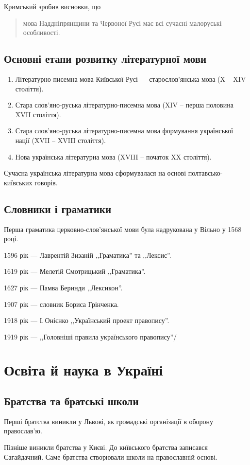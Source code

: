 \documentclass[a5paper,10pt,titlepage,pdftex,headsepline]{scrartcl}
\begin{document}
Кримський зробив висновки, що\begin{quote}мова Наддніпрянщини та Червоної Русі має всі сучасні малоруські особливості.\end{quote}
\subsection{Основні етапи розвитку літературної мови}
\begin{enumerate}
	\item Літературно-писемна мова Київської Русі --- старослов’янська мова (X -- XIV століття).
	\item Стара слов’яно-руська літературно-писемна мова (XIV -- перша половина XVII століття).
	\item Стара слов’яно-руська літературно-писемна мова формування української нації (XVII -- XVIII століття).
	\item Нова українська літературна мова (XVIII -- початок XX століття).
\end{enumerate}

Сучасна українська літературна мова сформувалася на основі полтавсько-київських говорів.
\subsection{Словники і граматики}
Перша граматика церковно-слов’янської мови була надрукована у Вільно у 1568 році.

1596 рік --- Лаврентій Зизаній ,,Граматика'' та ,,Лексис''.

1619 рік --- Мелетій Смотрицький ,,Граматика''.

1627 рік --- Памва Беринди ,,Лексикон''.

1907 рік --- словник Бориса Грінченка.

1918 рік --- І.\,Онієнко ,,Український проект правопису''.

1919 рік --- ,,Головніші правила українського правопису''/
\section{Освіта й наука в Україні}
\subsection{Братства та братські школи}
Перші братства виникли у Львові, як громадські організації в оборону православ’ю.

Пізніше виникли братства у Києві.
До київського братства записався Сагайдачний.
Саме братства створювали школи на православній основі.
\end{document}
